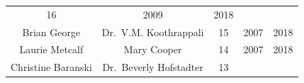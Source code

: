 \documentclass[]{book}
\theoremstyle{definition}
\theoremstyle{definition}
\theoremstyle{definition}
\theoremstyle{remark}
\begin{document}
\begin{longtable}[]{@{}ccccc@{}}
\begin{minipage}[t]{0.12\columnwidth}
16\strut
\end{minipage} & \begin{minipage}[t]{0.14\columnwidth}\centering\strut
2009\strut
\end{minipage} & \begin{minipage}[t]{0.11\columnwidth}\centering\strut
2018\strut
\end{minipage}\tabularnewline
\begin{minipage}[t]{0.22\columnwidth}\centering\strut
Brian George\strut
\end{minipage} & \begin{minipage}[t]{0.28\columnwidth}\centering\strut
Dr.~V.M. Koothrappali\strut
\end{minipage} & \begin{minipage}[t]{0.12\columnwidth}\centering\strut
15\strut
\end{minipage} & \begin{minipage}[t]{0.14\columnwidth}\centering\strut
2007\strut
\end{minipage} & \begin{minipage}[t]{0.11\columnwidth}\centering\strut
2018\strut
\end{minipage}\tabularnewline
\begin{minipage}[t]{0.22\columnwidth}\centering\strut
Laurie Metcalf\strut
\end{minipage} & \begin{minipage}[t]{0.28\columnwidth}\centering\strut
Mary Cooper\strut
\end{minipage} & \begin{minipage}[t]{0.12\columnwidth}\centering\strut
14\strut
\end{minipage} & \begin{minipage}[t]{0.14\columnwidth}\centering\strut
2007\strut
\end{minipage} & \begin{minipage}[t]{0.11\columnwidth}\centering\strut
2018\strut
\end{minipage}\tabularnewline
\begin{minipage}[t]{0.22\columnwidth}\centering\strut
Christine Baranski\strut
\end{minipage} & \begin{minipage}[t]{0.28\columnwidth}\centering\strut
Dr.~Beverly Hofstadter\strut
\end{minipage} & \begin{minipage}[t]{0.12\columnwidth}\centering\strut
13\strut
\end{minipage} & \begin{minipage}[t]{0.14\columnwidth}\centering\strut

\end{minipage}
\end{longtable}
\end{document}
